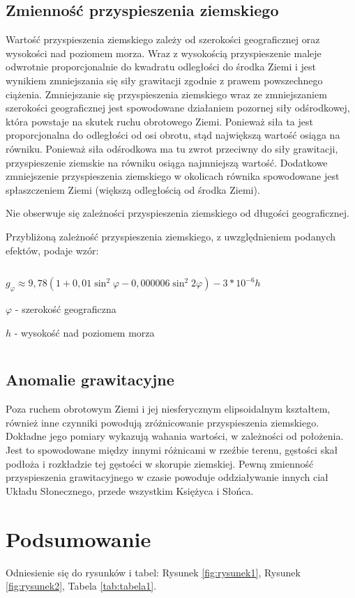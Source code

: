\documentclass{article}
\begin{document}
\subsection{Zmienność przyspieszenia ziemskiego}

Wartość przyspieszenia ziemskiego zależy od szerokości geograficznej oraz wysokości nad poziomem morza. Wraz z wysokością przyspieszenie maleje odwrotnie proporcjonalnie do kwadratu odległości do środka Ziemi i jest wynikiem zmniejszania się siły grawitacji zgodnie z prawem powszechnego ciążenia. Zmniejszanie się przyspieszenia ziemskiego wraz ze zmniejszaniem szerokości geograficznej jest spowodowane działaniem pozornej siły odśrodkowej, która powstaje na skutek ruchu obrotowego Ziemi. Ponieważ siła ta jest proporcjonalna do odległości od osi obrotu, stąd największą wartość osiąga na równiku. Ponieważ siła odśrodkowa ma tu zwrot przeciwny do siły grawitacji, przyspieszenie ziemskie na równiku osiąga najmniejszą wartość. Dodatkowe zmniejszenie przyspieszenia ziemskiego w okolicach równika spowodowane jest spłaszczeniem Ziemi (większą odległością od środka Ziemi).

Nie obserwuje się zależności przyspieszenia ziemskiego od długości geograficznej.

Przybliżoną zależność przyspieszenia ziemskiego, z uwzględnieniem podanych efektów, podaje wzór: 

$ $

\begin{center}
$ g_{\varphi } \approx 9,78 (1+ 0,01 \sin^2 \varphi - 0,000006 \sin^2 2\varphi) -3*10^{-6}h$
\end{center}

$\varphi$ - szerokość geograficzna

$h$ - wysokość nad poziomem morza

$ $

\subsection{Anomalie grawitacyjne}
Poza ruchem obrotowym Ziemi i jej niesferycznym elipsoidalnym kształtem, również inne czynniki powodują zróżnicowanie przyspieszenia ziemskiego. Dokładne jego pomiary wykazują wahania wartości, w zależności od położenia. Jest to spowodowane między innymi różnicami w rzeźbie terenu, gęstości skał podłoża i rozkładzie tej gęstości w skorupie ziemskiej. Pewną zmienność przyspieszenia grawitacyjnego w czasie powoduje oddziaływanie innych ciał Układu Słonecznego, przede wszystkim Księżyca i Słońca.

\newpage
\section{Podsumowanie}
    Odniesienie się do rysunków i tabel: Rysunek \ref{fig:rysunek1}, Rysunek \ref{fig:rysunek2},  Tabela \ref{tab:tabela1}.

\newpage



\end{document}
